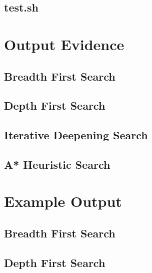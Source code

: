 \documentclass[a4paper]{article}
\begin{document}
\begin{appendices}
  \subsection{test.sh}
  \label{app:code-test}
  

  \newpage
  \section{Output Evidence}
  \subsection{Breadth First Search}
  \label{app:evidence-bfs}
  

  \subsection{Depth First Search}
  \label{app:evidence-dfs}
  

  \newpage
  \subsection{Iterative Deepening Search}
  \label{app:evidence-ids}
  

  \subsection{A* Heuristic Search}
  \label{app:evidence-a*}
  

  \newpage
  \section{Example Output}
  \subsection{Breadth First Search}
  \label{app:example-bfs}
  

  \newpage
  \subsection{Depth First Search}
  \label{app:example-dfs}
  


\end{appendices}
\end{document}
